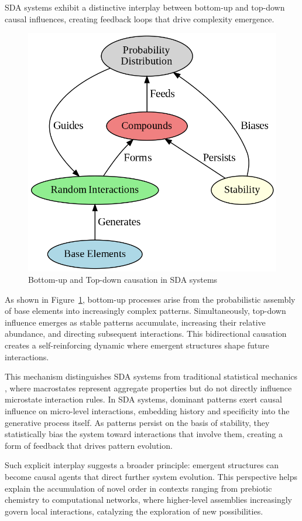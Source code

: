 \documentclass[preprint,12pt]{elsarticle}
\begin{document}
SDA systems exhibit a distinctive interplay between bottom-up and top-down causal influences, creating feedback loops that drive complexity emergence.

\begin{figure}[h]
    \centering
    \includegraphics[width=0.7\linewidth,height=0.7\linewidth]{figure_10.png}
    \caption{Bottom-up and Top-down causation in SDA systems}
    \label{fig:figure_10}
\end{figure}

As shown in Figure~\ref{fig:figure_10}, bottom-up processes arise from the probabilistic assembly of base elements into increasingly complex patterns. Simultaneously, top-down influence emerges as stable patterns accumulate, increasing their relative abundance, and directing subsequent interactions. This bidirectional causation creates a self-reinforcing dynamic where emergent structures shape future interactions.

This mechanism distinguishes SDA systems from traditional statistical mechanics \cite{landau1980statistical}, where macrostates represent aggregate properties but do not directly influence microstate interaction rules. In SDA systems, dominant patterns exert causal influence on micro-level interactions, embedding history and specificity into the generative process itself. As patterns persist on the basis of stability, they statistically bias the system toward interactions that involve them, creating a form of feedback that drives pattern evolution.

Such explicit interplay suggests a broader principle: emergent structures can become causal agents that direct further system evolution. This perspective helps explain the accumulation of novel order in contexts ranging from prebiotic chemistry to computational networks, where higher-level assemblies increasingly govern local interactions, catalyzing the exploration of new possibilities.
\end{document}
